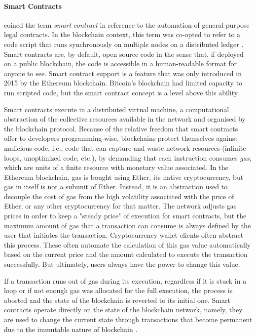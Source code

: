 \documentclass[../access.tex]{subfiles}
\begin{document}
        \paragraph{Smart Contracts}
            \cite{Szabo1997} coined the term \textit{smart contract} in reference to the automation of general-purpose legal contracts. In the blockchain context, this term was co-opted to refer to a code script that runs synchronously on multiple nodes on a distributed ledger \cite{Zou2021}. Smart contracts are, by default, open source code in the sense that, if deployed on a public blockchain, the code is accessible in a human-readable format for anyone to see. Smart contract support is a feature that was only introduced in 2015 by the Ethereum blockchain. Bitcoin's blockchain had limited capacity to run scripted code, but the smart contract concept is a level above this ability.
            \par
            Smart contracts execute in a distributed virtual machine, a computational abstraction of the collective resources available in the network and organised by the blockchain protocol. Because of the relative freedom that smart contracts offer to developers programming-wise, blockchains protect themselves against malicious code, i.e., code that can capture and waste network resources (infinite loops, unoptimized code, etc.), by demanding that each instruction consumes \textit{gas}, which are units of a finite resource with monetary value associated. In the Ethereum blockchain, gas is bought using Ether, its native cryptocurrency, but gas in itself is not a subunit of Ether. Instead, it is an abstraction used to decouple the cost of gas from the high volatility associated with the price of Ether, or any other cryptocurrency for that matter. The network adjusts gas prices in order to keep a "steady price" of execution for smart contracts, but the maximum amount of gas that a transaction can consume is always defined by the user that initiates the transaction. Cryptocurrency wallet clients often abstract this process. These often automate the calculation of this gas value automatically based on the current price and the amount calculated to execute the transaction successfully. But ultimately, users always have the power to change this value.
            \par
            If a transaction runs out of gas during its execution, regardless if it is stuck in a loop or if not enough gas was allocated for the full execution, the process is aborted and the state of the blockchain is reverted to its initial one. Smart contracts operate directly on the state of the blockchain network, namely, they are used to change the current state through transactions that become permanent due to the immutable nature of blockchain \cite{Dannen2016}.
\end{document}
